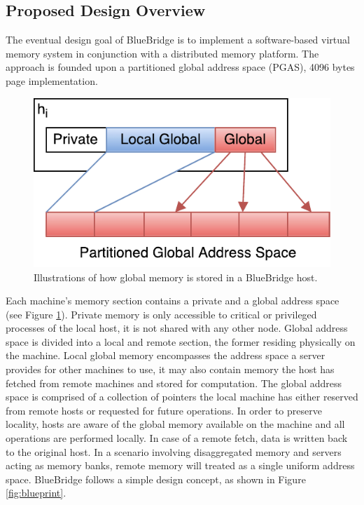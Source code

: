 \subsection{Proposed Design Overview}
The eventual design goal of BlueBridge is to implement a software-based virtual memory system in conjunction with a distributed memory platform. The approach is founded upon a partitioned global address space (PGAS), 4096 bytes page implementation.
\begin{figure}[t]
    \centering
    \includegraphics[width=\columnwidth]{Images/BlueBridgeHostMemory.pdf}
    \caption{Illustrations of how global memory is stored in a BlueBridge host.}
    \label{fig:pgas}
\end{figure}
Each machine's memory section contains a private and a global address space (see Figure \ref{fig:pgas}). Private memory is only accessible to critical or privileged processes of the local host, it is not shared with any other node. Global address space is divided into a local and remote section, the former residing physically on the machine.
Local global memory encompasses the address space a server provides for other machines to use, it may also contain memory the host has fetched from remote machines and stored for computation. The global address space is comprised of a collection of pointers the local machine has either reserved from remote hosts or requested for future operations.
In order to preserve locality, hosts are aware of the global memory available on the machine and all operations are performed locally. In case of a remote fetch, data is written back to the original host. In a scenario involving disaggregated memory and servers acting as memory banks, remote memory will treated as a single uniform address space.
BlueBridge follows a simple design concept, as shown in Figure \ref{fig:blueprint}.

